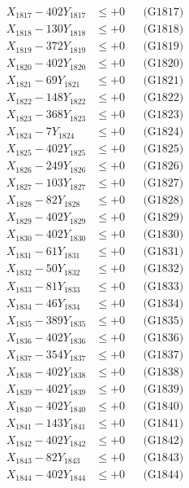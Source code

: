 \documentclass[a4paper,10pt]{article}
\begin{document}
{\begin{align}
X_{1817} - 402Y_{1817} &\leq +0 && \text{(G1817)} \\
X_{1818} - 130Y_{1818} &\leq +0 && \text{(G1818)} \\
X_{1819} - 372Y_{1819} &\leq +0 && \text{(G1819)} \\
X_{1820} - 402Y_{1820} &\leq +0 && \text{(G1820)} \\
\allowbreak
X_{1821} - 69Y_{1821} &\leq +0 && \text{(G1821)} \\
X_{1822} - 148Y_{1822} &\leq +0 && \text{(G1822)} \\
X_{1823} - 368Y_{1823} &\leq +0 && \text{(G1823)} \\
X_{1824} - 7Y_{1824} &\leq +0 && \text{(G1824)} \\
X_{1825} - 402Y_{1825} &\leq +0 && \text{(G1825)} \\
X_{1826} - 249Y_{1826} &\leq +0 && \text{(G1826)} \\
X_{1827} - 103Y_{1827} &\leq +0 && \text{(G1827)} \\
X_{1828} - 82Y_{1828} &\leq +0 && \text{(G1828)} \\
X_{1829} - 402Y_{1829} &\leq +0 && \text{(G1829)} \\
X_{1830} - 402Y_{1830} &\leq +0 && \text{(G1830)} \\
\allowbreak
X_{1831} - 61Y_{1831} &\leq +0 && \text{(G1831)} \\
X_{1832} - 50Y_{1832} &\leq +0 && \text{(G1832)} \\
X_{1833} - 81Y_{1833} &\leq +0 && \text{(G1833)} \\
X_{1834} - 46Y_{1834} &\leq +0 && \text{(G1834)} \\
X_{1835} - 389Y_{1835} &\leq +0 && \text{(G1835)} \\
X_{1836} - 402Y_{1836} &\leq +0 && \text{(G1836)} \\
X_{1837} - 354Y_{1837} &\leq +0 && \text{(G1837)} \\
X_{1838} - 402Y_{1838} &\leq +0 && \text{(G1838)} \\
X_{1839} - 402Y_{1839} &\leq +0 && \text{(G1839)} \\
X_{1840} - 402Y_{1840} &\leq +0 && \text{(G1840)} \\
\allowbreak
X_{1841} - 143Y_{1841} &\leq +0 && \text{(G1841)} \\
X_{1842} - 402Y_{1842} &\leq +0 && \text{(G1842)} \\
X_{1843} - 82Y_{1843} &\leq +0 && \text{(G1843)} \\
X_{1844} - 402Y_{1844} &\leq +0 && \text{(G1844)} \\

\end{align}}
\end{document}

